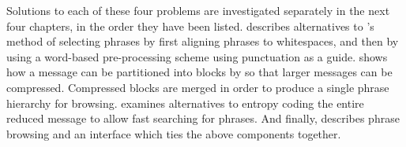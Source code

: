 Solutions to each of these
four problems are investigated separately in the next
four chapters, in the order they have been listed.  
 describes alternatives to \repair's
method of selecting phrases by first aligning phrases to
whitespaces, and then by using a word-based pre-processing scheme
using punctuation as a guide.   shows how
a message can be partitioned into blocks by \repair so that 
larger messages can be compressed.  Compressed blocks are merged
in order to produce a single phrase hierarchy for browsing.
 examines alternatives to
entropy coding the entire reduced message to allow fast 
searching for phrases.  And finally, 
describes phrase browsing and an interface which ties the
above components together.

